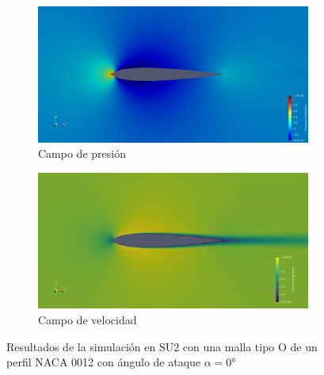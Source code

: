 \documentclass[letterpaper, openright, 12pt]{book}
\begin{document}
    \begin{figure}[htbp!]
        \centering
        \begin{subfigure}[c]{0.48\textwidth}
            \includegraphics[keepaspectratio, width=0.99\textwidth]
                {./img/su2/mo_cp_alfa_0}
            \caption{Campo de presión}
            \label{fig:mo_cp_0}
        \end{subfigure}
        \begin{subfigure}[c]{0.48\textwidth}
            \includegraphics[keepaspectratio, width=0.99\textwidth]
                {./img/su2/mo_vel_alfa_0}
            \caption{Campo de velocidad}
            \label{fig:mo_vel_0}
        \end{subfigure}
        \caption[Resultados de simulaciones para malla O en SU2]{Resultados
            de la simulación en SU2 con una malla tipo O de un perfil NACA 0012
            con ángulo de ataque $\alpha = 0\si{\degree}$}
        \label{fig:mo_su2_0}
    \end{figure}
\end{document}
